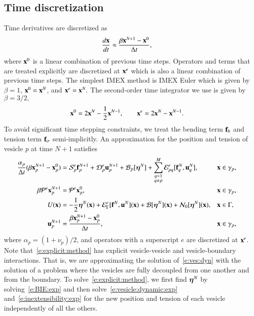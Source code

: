 \subsection{Time discretization}
Time derivatives are discretized as
\begin{align*}
  \frac{d{\mathbf{x}}}{dt} \approx \frac{\beta{\mathbf{x}}^{N+1} - {\mathbf{x}}^{0}}{\Delta t},
\end{align*}
where ${\mathbf{x}}^{0}$ is a linear combination of previous time steps.
Operators and terms that are treated explicitly are discretized at
${\mathbf{x}}^{e}$ which is also a linear combination of previous time steps.
The simplest IMEX method is IMEX Euler which is given by $\beta=1$,
${\mathbf{x}}^{0} = {\mathbf{x}}^{N}$, and ${\mathbf{x}}^{e} = {\mathbf{x}}^{N}.$ The second-order time
integrator we use is given by $\beta=3/2,$
\begin{align*}
{\mathbf{x}}^{0} = 2{\mathbf{x}}^{N} - \frac{1}{2}{\mathbf{x}}^{N-1}, \hspace{20pt}
{\mathbf{x}}^{e} = 2{\mathbf{x}}^{N} - {\mathbf{x}}^{N-1}.
\end{align*}
To avoid significant time stepping constraints, we treat the bending
term ${\mathbf{f}}_{b}$ and tension term ${\mathbf{f}}_{\sigma}$ semi-implicitly.  An
approximation for the position and tension of vesicle $p$ at time $N+1$
satisfies
\begin{subequations}
  \begin{align}
    \frac{\alpha_{p}}{\Delta t}(\beta {\mathbf{x}}_{p}^{N+1} - {\mathbf{x}}_{p}^{0}) &= 
      {\mathcal{S}}_{p}^{e} {\mathbf{f}}_{p}^{N+1} + 
      {\mathcal{D}}_{p}^{e}{\mathbf{u}}_{p}^{N+1} + {\mathcal{B}}_{p}[{\boldsymbol\eta}^{N}] 
      + \sum_{\substack{q=1 \\ q \neq p}}^{M} {\mathcal{E}}_{pq}^{e}[{\mathbf{f}}_{q}^{N},{\mathbf{u}}_{q}^{N}], 
      &&{\mathbf{x}} \in \gamma_{p},
      \label{e:vesicle:dynamic:exp} \\
      \beta \mathcal{P}^{e}{\mathbf{x}}_{p}^{N+1} &= \mathcal{P}^{e}{\mathbf{x}}_{p}^{0},
      &&{\mathbf{x}} \in \gamma_{p},
      \label{e:inextensibility:exp} \\
      U({\mathbf{x}}) &= -\frac{1}{2}{\boldsymbol\eta}^{N}({\mathbf{x}}) + {\mathcal{E}}_{\Gamma}^{e}[{\mathbf{f}}^{N},{\mathbf{u}}^{N}]({\mathbf{x}}) + 
      {\mathcal{B}}[{\boldsymbol\eta}^{N}]({\mathbf{x}}) + \mathcal{N}_{0}[{\boldsymbol\eta}^{N}]({\mathbf{x}}), &&{\mathbf{x}} \in \Gamma, 
      \label{e:BIE:exp} \\
      {\mathbf{u}}_{p}^{N+1} &= \frac{\beta {\mathbf{x}}_{p}^{N+1}-{\mathbf{x}}_{p}^{0}}{\Delta t},
      &&{\mathbf{x}} \in \gamma_{p},
      \label{e:velocity:exp}
  \end{align}
  \label{e:explicit:method}
\end{subequations}
where $\alpha_{p} = (1+\nu_{p})/2$, and operators with a superscript $e$
are discretized at ${\mathbf{x}}^{e}$.  Note that~\eqref{e:explicit:method} has
explicit vesicle-vesicle and vesicle-boundary interactions.  That is, we
are approximating the solution of~\eqref{e:ves:dyn} with the solution of
a problem where the vesicles are fully decoupled from one another and
from the boundary.  To solve~\eqref{e:explicit:method}, we first find
${\boldsymbol\eta}^{N}$ by solving~\eqref{e:BIE:exp} and then
solve~\eqref{e:vesicle:dynamic:exp} and~\eqref{e:inextensibility:exp}
for the new position and tension of each vesicle independently of all
the others.

